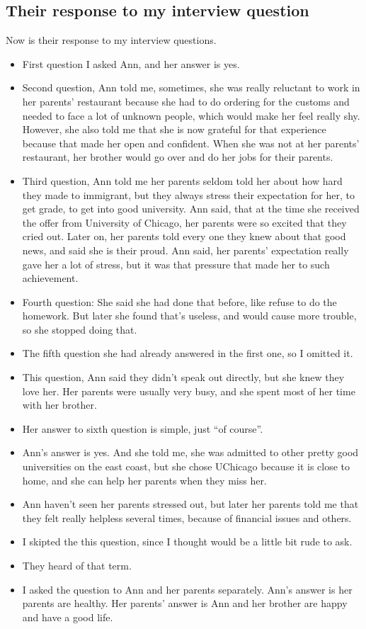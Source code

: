 \subsection{Their response to my interview question}
Now is their response to my interview questions.
\begin{itemize}
  \item First question I asked Ann, and her answer is yes.
  \item Second question, Ann told me, sometimes, she was really reluctant to
  work in her parents' restaurant because she had to do ordering for the
  customs and needed to face a lot of unknown people, which would make her feel
  really shy. However, she also told me that she is now grateful for that 
  experience because that made her open and confident. When she was not at her
  parents' restaurant, her brother would go over and do her jobs for their
  parents.
  \item Third question, Ann told me her parents seldom told her about how hard
  they made to immigrant, but they always stress their expectation for her, to
  get grade, to get into good university. Ann said, that at the time she
  received the offer from University of Chicago, her parents were so excited
  that they cried out. Later on, her parents told every one they knew about that
  good news, and said she is their proud. Ann said, her parents' expectation
  really gave her a lot of stress, but it was that pressure that made her to
  such achievement.
  \item Fourth question: She said she had done that before, like refuse to do
  the homework. But later she found that's useless, and would cause more
  trouble, so she stopped doing that.
  \item The fifth question she had already answered in the first one, so I
  omitted it.
  \item This question, Ann said they didn't speak out directly, but she knew
  they love her. Her parents were usually very busy, and she spent most of her
  time with her brother.
  \item Her answer to sixth question is simple, just ``of course''.
  \item Ann's answer is yes. And she told me, she was admitted to other pretty
  good universities on the east coast, but she chose UChicago because it is
  close to home, and she can help her parents when they miss her.
  \item Ann haven't seen her parents stressed out, but later her parents told me
  that they felt really helpless several times, because of financial issues and
  others.
  \item I skipted the this question, since I thought would be a little bit rude
  to ask.
  \item They heard of that term.
  \item I asked the question to Ann and her parents separately. Ann's answer is
  her parents are healthy. Her parents' answer is Ann and her brother
  are happy and have a good life.
\end{itemize}